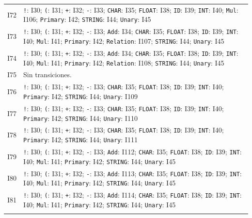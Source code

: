 {\begin{longtable}{@{}r p{14.7cm}@{}}
I72 & \texttt{!}: I30; \texttt{(}: I31; \texttt{+}: I32; \texttt{-}: I33; \texttt{CHAR}: I35; \texttt{FLOAT}: I38; \texttt{ID}: I39; \texttt{INT}: I40; \texttt{Mul}: I106; \texttt{Primary}: I42; \texttt{STRING}: I44; \texttt{Unary}: I45\\\addlinespace[3pt]
I73 & \texttt{!}: I30; \texttt{(}: I31; \texttt{+}: I32; \texttt{-}: I33; \texttt{Add}: I34; \texttt{CHAR}: I35; \texttt{FLOAT}: I38; \texttt{ID}: I39; \texttt{INT}: I40; \texttt{Mul}: I41; \texttt{Primary}: I42; \texttt{Relation}: I107; \texttt{STRING}: I44; \texttt{Unary}: I45\\\addlinespace[3pt]
I74 & \texttt{!}: I30; \texttt{(}: I31; \texttt{+}: I32; \texttt{-}: I33; \texttt{Add}: I34; \texttt{CHAR}: I35; \texttt{FLOAT}: I38; \texttt{ID}: I39; \texttt{INT}: I40; \texttt{Mul}: I41; \texttt{Primary}: I42; \texttt{Relation}: I108; \texttt{STRING}: I44; \texttt{Unary}: I45\\\addlinespace[3pt]
I75 & Sin transiciones.\\\addlinespace[3pt]
I76 & \texttt{!}: I30; \texttt{(}: I31; \texttt{+}: I32; \texttt{-}: I33; \texttt{CHAR}: I35; \texttt{FLOAT}: I38; \texttt{ID}: I39; \texttt{INT}: I40; \texttt{Primary}: I42; \texttt{STRING}: I44; \texttt{Unary}: I109\\\addlinespace[3pt]
I77 & \texttt{!}: I30; \texttt{(}: I31; \texttt{+}: I32; \texttt{-}: I33; \texttt{CHAR}: I35; \texttt{FLOAT}: I38; \texttt{ID}: I39; \texttt{INT}: I40; \texttt{Primary}: I42; \texttt{STRING}: I44; \texttt{Unary}: I110\\\addlinespace[3pt]
I78 & \texttt{!}: I30; \texttt{(}: I31; \texttt{+}: I32; \texttt{-}: I33; \texttt{CHAR}: I35; \texttt{FLOAT}: I38; \texttt{ID}: I39; \texttt{INT}: I40; \texttt{Primary}: I42; \texttt{STRING}: I44; \texttt{Unary}: I111\\\addlinespace[3pt]
I79 & \texttt{!}: I30; \texttt{(}: I31; \texttt{+}: I32; \texttt{-}: I33; \texttt{Add}: I112; \texttt{CHAR}: I35; \texttt{FLOAT}: I38; \texttt{ID}: I39; \texttt{INT}: I40; \texttt{Mul}: I41; \texttt{Primary}: I42; \texttt{STRING}: I44; \texttt{Unary}: I45\\\addlinespace[3pt]
I80 & \texttt{!}: I30; \texttt{(}: I31; \texttt{+}: I32; \texttt{-}: I33; \texttt{Add}: I113; \texttt{CHAR}: I35; \texttt{FLOAT}: I38; \texttt{ID}: I39; \texttt{INT}: I40; \texttt{Mul}: I41; \texttt{Primary}: I42; \texttt{STRING}: I44; \texttt{Unary}: I45\\\addlinespace[3pt]
I81 & \texttt{!}: I30; \texttt{(}: I31; \texttt{+}: I32; \texttt{-}: I33; \texttt{Add}: I114; \texttt{CHAR}: I35; \texttt{FLOAT}: I38; \texttt{ID}: I39; \texttt{INT}: I40; \texttt{Mul}: I41; \texttt{Primary}: I42; \texttt{STRING}: I44; \texttt{Unary}: I45\\\addlinespace[3pt]

\end{longtable}}
